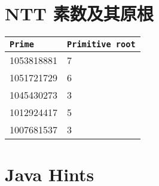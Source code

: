 \section{NTT 素数及其原根}
\begin{tabular}{|l|l|}
\hline
\texttt{Prime} & \texttt{Primitive root} \\
\hline
1053818881 & 7 \\
\hline
1051721729 & 6 \\
\hline
1045430273 & 3 \\
\hline
1012924417 & 5 \\
\hline
1007681537 & 3 \\
\hline
\end{tabular}

\section {Java Hints}
\inputminted{java}{\source/hints/template.java}

